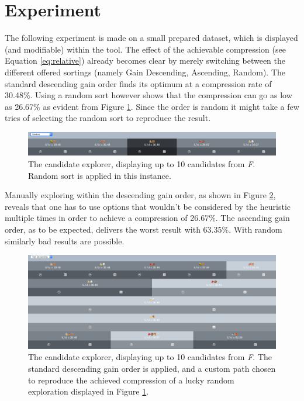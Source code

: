 \documentclass[runningheads]{llncs}
\begin{document}
\section{Experiment}
\label{sec:experiment}
The following experiment is made on a small prepared dataset, which is displayed (and modifiable) within the tool.
The effect of the achievable compression (see Equation \ref{eq:relative}) already becomes clear by merely switching between the different offered sortings (namely Gain Descending, Ascending, Random).
The standard descending gain order finds its optimum at a compression rate of 30.48\%. Using a random sort however shows that the compression can go as low as 26.67\% as evident from Figure \ref{fig:random}. Since the order is random it might take a few tries of selecting the random sort to reproduce the result.
\begin{figure}
\center
\includegraphics[width=1\linewidth]{img/random_better.png}
\caption{The candidate explorer, displaying up to 10 candidates from \emph{F}. Random sort is applied in this instance.}
\label{fig:random}
\end{figure}

Manually exploring within the descending gain order, as shown in Figure \ref{fig:customWalk}, reveals that one has to use options that wouldn't be considered by the heuristic multiple times in order to achieve a compression of 26.67\%.
The ascending gain order, as to be expected, delivers the worst result with 63.35\%. With random similarly bad results are possible.

\begin{figure}
\center
\includegraphics[width=1\linewidth]{img/custom_walk.png}
\caption{The candidate explorer, displaying up to 10 candidates from \emph{F}. The standard descending gain order is applied, and a custom path chosen to reproduce the achieved compression of a lucky random exploration displayed in Figure \ref{fig:random}.}
\label{fig:customWalk}
\end{figure}
\end{document}
